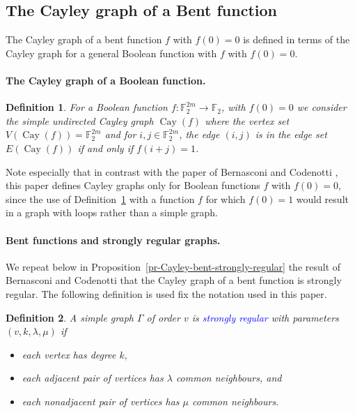 \documentclass[12pt,a4paper]{article}
\newcommand{\mb}[1]{\mathbb{#1}}
\newcommand{\F}{\mb{F}}
\newcommand{\To}{\rightarrow}
\newcommand{\Emph}[1]{\emph{\textcolor{blue}{#1}}}
\newcommand{\Cay}[1]{\operatorname{Cay}\left(#1\right)}
\newtheorem{Definition}{Definition}
\begin{document}
\subsection{The Cayley graph of a Bent function}

The Cayley graph of a bent function $f$ with $f(0)=0$ is defined
in terms of the Cayley graph for a general Boolean function with $f$ with $f(0)=0$.
\paragraph*{The Cayley graph of a Boolean function.}
\begin{Definition}
\label{def-Cayley-graph}
For a Boolean function $f : \F_2^{2 m} \To \F_2$, with $f(0)=0$ we consider the simple undirected
\emph{Cayley graph} $\Cay{f}$  \cite[3.1]{BerC99}
where the vertex set $V(\Cay{f}) = \F_2^{2 m}$ and for $i,j \in \F_2^{2 m}$, the edge $(i,j)$ is in
the edge set $E(\Cay{f})$ if and only if $f(i+j)=1$.
\end{Definition}
Note especially that in contrast with the paper of Bernasconi and Codenotti \cite{BerC99},
this paper defines Cayley graphs only for Boolean functions $f$ with $f(0)=0$,
since the use of Definition~\ref{def-Cayley-graph} with a function $f$ for which $f(0)=1$ would
result in a graph with loops rather than a simple graph.

\paragraph*{Bent functions and strongly regular graphs.}
We repeat below in Proposition~\ref{pr-Cayley-bent-strongly-regular}
the result of Bernasconi and Codenotti \cite{BerC99}
that the Cayley graph of a bent function is strongly regular.
The following definition is used fix the notation used in this paper.
\begin{Definition}
\label{def-strongly-regular-graph}
%
A simple graph $\Gamma$ of order $v$ is \Emph{strongly regular} \cite{Bos63,BroCN89,Sei79} with
parameters
$(v,k,\lambda,\mu)$ if
\begin{itemize}
 \item
each vertex has degree $k,$
 \item
each adjacent pair of vertices has $\lambda$ common neighbours, and
\item
each nonadjacent pair of vertices has $\mu$ common neighbours.
\end{itemize}
%
\end{Definition}
%
\end{document}
